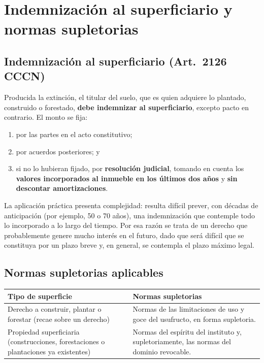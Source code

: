 \documentclass[12pt,oneside]{book}
\begin{document}
\chapter[Indemnización y normas supletorias]{Indemnización al superficiario y normas supletorias}

\section{Indemnización al superficiario (Art.~2126 CCCN)}

\begin{important}
Producida la extinción, el titular del suelo, que es quien adquiere lo plantado, construido o forestado, \textbf{debe indemnizar al superficiario}, excepto pacto en contrario. El monto se fija:
\begin{enumerate}[label=(\alph*)]
    \item por las partes en el acto constitutivo;
    \item por acuerdos posteriores; y
    \item si no lo hubieran fijado, por \textbf{resolución judicial}, tomando en cuenta los \textbf{valores incorporados al inmueble en los últimos dos años} y \textbf{sin descontar amortizaciones}.
\end{enumerate}
\end{important}

La aplicación práctica presenta complejidad: resulta difícil prever, con décadas de anticipación (por ejemplo, 50 o 70 años), una indemnización que contemple todo lo incorporado a lo largo del tiempo. Por esa razón se trata de un derecho que probablemente genere mucho interés en el futuro, dado que será difícil que se constituya por un plazo breve y, en general, se contempla el plazo máximo legal.

\section{Normas supletorias aplicables}

\begin{table}[H]
\centering
\renewcommand{\arraystretch}{1.3}
\begin{tabularx}{\textwidth}{
    >{\raggedright\arraybackslash}p{}
    >{\raggedright\arraybackslash}X
}
\toprule
\textbf{Tipo de superficie} & \textbf{Normas supletorias} \\
\midrule
Derecho a construir, plantar o forestar (recae sobre un derecho) &
Normas de las limitaciones de uso y goce del usufructo, en forma supletoria. \\
\midrule
Propiedad superficiaria (construcciones, forestaciones o plantaciones ya existentes) &
Normas del espíritu del instituto y, supletoriamente, las normas del dominio revocable. \\
\bottomrule
\end{tabularx}
\end{table}
\end{document}
